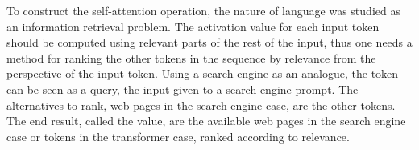 \documentclass{article}
\begin{document}
To construct the self-attention operation, the nature of language was studied 
as an information retrieval problem. The activation value for each input token should be computed 
using relevant parts of the rest of the input, thus one needs a method for ranking the other tokens 
in the sequence by relevance from the perspective of the input token. Using a search engine as an analogue, 
the token can be seen as a query, the input given to a search engine prompt. The alternatives to rank, 
web pages in the search engine case, are the other tokens. The end result, called the value, are the 
available web pages in the search engine case or tokens in the transformer case, ranked according to relevance.
\end{document}
